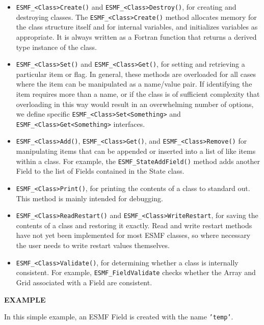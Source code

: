 \begin{itemize}

\item {\tt ESMF\_<Class>Create()} and {\tt ESMF\_<Class>Destroy()}, for creating and 
destroying classes.  The {\tt ESMF\_<Class>Create()} method allocates 
memory for the class structure itself and for internal variables, and
initializes variables as appropriate.  It is always written as a 
Fortran function that returns a derived type instance of the class.

\item {\tt ESMF\_<Class>Set()} and {\tt ESMF\_<Class>Get()}, for setting 
and retrieving a particular item or flag.  In general, these methods are
overloaded for all cases where the item can be manipulated as a
name/value pair.  If identifying the item requires more than a 
name, or if the class is of sufficient complexity that overloading
in this way would result in an overwhelming number of options, we 
define specific {\tt ESMF\_<Class>Set<Something>} and 
{\tt ESMF\_<Class>Get<Something>} interfaces.

\item {\tt ESMF\_<Class>Add()}, {\tt ESMF\_<Class>Get()}, and 
{\tt ESMF\_<Class>Remove()} for manipulating 
items that can be appended or inserted into a list of like
items within a class.  For example, the {\tt ESMF\_StateAddField()}
method adds another Field to the list of Fields contained
in the State class.

\item {\tt ESMF\_<Class>Print()}, for printing the contents of a class to 
standard out.  This method is mainly intended for debugging.

\item {\tt ESMF\_<Class>ReadRestart()} and {\tt ESMF\_<Class>WriteRestart}, 
for saving the contents of a class and restoring it exactly.  Read
and write restart methods have not yet been implemented for most
ESMF classes, so where necessary the user needs to write restart 
values themselves.

\item {\tt ESMF\_<Class>Validate()}, for determining whether a class is 
internally consistent.  For example, {\tt ESMF\_FieldValidate} checks 
whether the Array and Grid associated with a Field are consistent.

\end{itemize}

{\bf EXAMPLE}

In this simple example, an ESMF Field is created with the 
name {\tt 'temp'}.  

